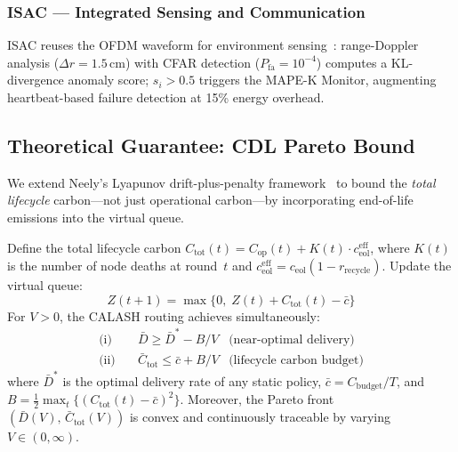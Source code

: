\subsubsection{ISAC --- Integrated Sensing and Communication}
\label{art2:sec:isac}

ISAC reuses the OFDM waveform for environment sensing~\cite{liu2022isac, zhang2022isac_overview}: range-Doppler analysis ($\Delta r{=}1.5$\,cm) with CFAR detection ($P_{\text{fa}}{=}10^{-4}$) computes a KL-divergence anomaly score; $s_i > 0.5$ triggers the MAPE-K Monitor, augmenting heartbeat-based failure detection at 15\% energy overhead.

\subsection{Theoretical Guarantee: CDL Pareto Bound}
\label{art2:sec:theorem}

We extend Neely's Lyapunov drift-plus-penalty framework~\cite{neely2010lyapunov} to bound the \emph{total lifecycle} carbon---not just operational carbon---by incorporating end-of-life emissions into the virtual queue.

\begin{theorem}
\label{art2:thm:cdl}
Define the total lifecycle carbon $C_{\text{tot}}(t) = C_{\text{op}}(t) + K(t) \cdot c_{\text{eol}}^{\text{eff}}$, where $K(t)$ is the number of node deaths at round~$t$ and $c_{\text{eol}}^{\text{eff}} = c_{\text{eol}} (1 - r_{\text{recycle}})$.
Update the virtual queue:
\begin{equation}
    Z(t+1) = \max\big\{0,\; Z(t) + C_{\text{tot}}(t) - \bar{c}\big\}
    \label{art2:eq:queue_update_cdl}
\end{equation}
For $V > 0$, the CALASH routing achieves simultaneously:
\begin{align}
    \text{(i)}  & \quad \bar{D} \geq \bar{D}^* - B/V  & \text{(near-optimal delivery)} \label{art2:eq:delivery_bound} \\
    \text{(ii)} & \quad \bar{C}_{\text{tot}} \leq \bar{c} + B/V  & \text{(lifecycle carbon budget)} \label{art2:eq:carbon_bound}
\end{align}
where $\bar{D}^*$ is the optimal delivery rate of any static policy, $\bar{c} = C_{\text{budget}}/T$, and $B = \frac{1}{2}\max_t\{(C_{\text{tot}}(t) - \bar{c})^2\}$.
Moreover, the Pareto front $(\bar{D}(V),\, \bar{C}_{\text{tot}}(V))$ is convex and continuously traceable by varying $V \in (0, \infty)$.
\end{theorem}


